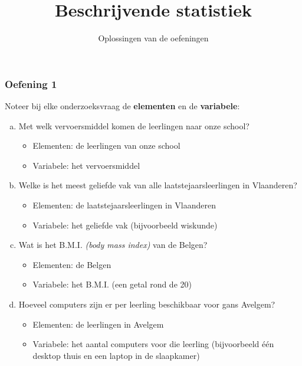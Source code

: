 \documentclass[13pt]{beamer}
\title{Beschrijvende statistiek}
\subtitle{Oplossingen van de oefeningen}
\author{}
\institute{}
\date{}%
\newenvironment{answer}
{\color{blue}}
{\color{black}}
\begin{document}
\begin{frame}
  \titlepage%
\end{frame}

\begin{frame}
  \frametitle{Oefening 1}
  Noteer bij elke onderzoeksvraag de {\bf elementen} en de {\bf variabele}:
  \begin{enumerate}[(a)]
  \item Met welk vervoersmiddel komen de leerlingen naar onze school?
    \begin{itemize}
      \begin{answer}
      \item Elementen: de leerlingen van onze school
      \item Variabele: het vervoersmiddel
      \end{answer}
    \end{itemize}
  \item Welke is het meest geliefde vak van alle laatstejaarsleerlingen in Vlaanderen?
    \begin{itemize}
      \begin{answer}
      \item Elementen: de laatstejaarsleerlingen in Vlaanderen
      \item Variabele: het geliefde vak (bijvoorbeeld wiskunde)
      \end{answer}
    \end{itemize}
  \item Wat is het B.M.I. {\em (body mass index)} van de Belgen?
    \begin{itemize}
      \begin{answer}
      \item Elementen: de Belgen
      \item Variabele: het B.M.I. (een getal rond de 20)
      \end{answer}
    \end{itemize}
  \item Hoeveel computers zijn er per leerling beschikbaar voor gans Avelgem?
    \begin{itemize}
      \begin{answer}
      \item Elementen: de leerlingen in Avelgem
      \item Variabele: het aantal computers voor die leerling (bijvoorbeeld één desktop thuis en een laptop in de slaapkamer)
      \end{answer}
    \end{itemize}
  \end{enumerate}
\end{frame}
\end{document}
